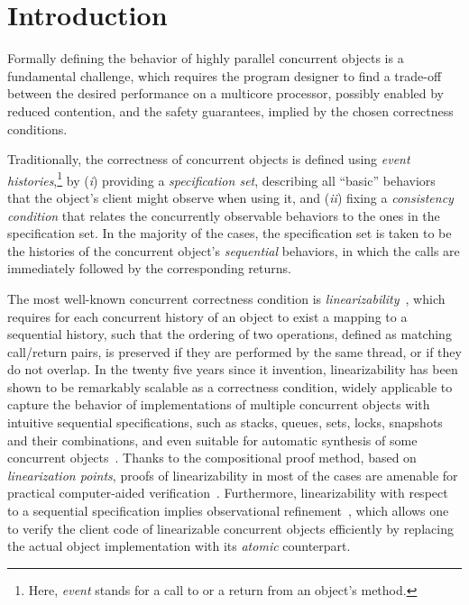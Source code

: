 \section{Introduction}
\label{sec:introduction}

Formally defining the behavior of highly parallel concurrent objects
is a fundamental challenge, which requires the program designer to
find a trade-off between the desired performance on a multicore
processor, possibly enabled by reduced contention, and the safety
guarantees, implied by the chosen correctness conditions.
 
Traditionally, the correctness of concurrent objects is defined using
\emph{event histories},\footnote{Here, \emph{event} stands for a call
  to or a return from an object's method.}  by (\emph{i}) providing a
\emph{specification set}, describing all ``basic'' behaviors that the
object's client might observe when using it, and (\emph{ii}) fixing a
\emph{consistency condition} that relates the concurrently observable
behaviors to the ones in the specification set.
% 
In the majority of the cases, the specification set is taken to be the
histories of the concurrent object's \emph{sequential} behaviors, in
which the calls are immediately followed by the corresponding returns.
 
The most well-known concurrent correctness condition is
\emph{linearizability}~\cite{Herlihy-Wing:TOPLAS90}, which requires
for each concurrent history of an object to exist a mapping to a
sequential history, such that the ordering of two operations, defined
as matching call/return pairs, is preserved if they are performed by
the same thread, or if they do not overlap.
% 
In the twenty five years since it invention, linearizability has been
shown to be remarkably scalable as a correctness condition, widely
applicable to capture the behavior of implementations of multiple
concurrent objects with intuitive sequential specifications, such as
stacks, queues, sets, locks, snapshots and their combinations, and
even suitable for automatic synthesis of some concurrent
objects~\cite{Vechev-Yahav:PLDI08}. Thanks to the compositional proof
method, based on \emph{linearization points}, proofs of
linearizability in most of the cases are amenable for practical
computer-aided
verification~\cite{Burckhardt-al:PLDI10,Derrick-al:TOPLAS11,Vafeiadis:CAV10,Amit-al:CAV07,Shacham-al:OOPSLA11}.
%
Furthermore, linearizability with respect to a sequential
specification implies observational
refinement~\cite{Filipovic-al:TCS10,Emmi-al:PLDI15}, which allows one
to verify the client code of linearizable concurrent objects
efficiently by replacing the actual object implementation with its
\emph{atomic} counterpart.

